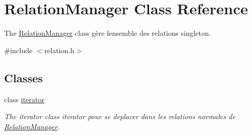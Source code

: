 \hypertarget{class_relation_manager}{}\section{Relation\+Manager Class Reference}
\label{class_relation_manager}


The \hyperlink{class_relation_manager}{Relation\+Manager} class gère l\textquotesingle{}ensemble des relations singleton.  




{\ttfamily \#include $<$relation.\+h$>$}

\subsection*{Classes}
\begin{DoxyCompactItemize}
\item 
class \hyperlink{class_relation_manager_1_1iterator}{iterator}
\begin{DoxyCompactList}\small\item\em The iterator class iterator pour se deplacer dans les relations normales de \hyperlink{class_relation_manager}{Relation\+Manager}. \end{DoxyCompactList}\end{DoxyCompactItemize}
